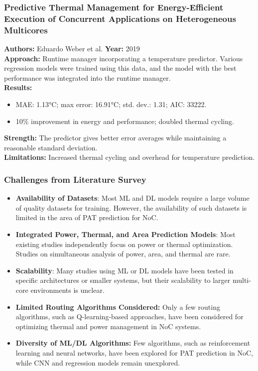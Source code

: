 \documentclass{beamer}
\begin{document}
\begin{frame}
\frametitle{Predictive Thermal Management for Energy-Efficient Execution of Concurrent Applications on Heterogeneous Multicores}

\textbf{Authors:} Eduardo Weber et al.
\textbf{Year:} 2019 \\[10pt]

\textbf{Approach:} Runtime manager incorporating a temperature predictor. Various regression models were trained using this data, and the model with the best performance was integrated into the runtime manager. \\[10pt]

\textbf{Results:}
\begin{itemize}
\item MAE: 1.13°C; max error: 16.91°C; std. dev.: 1.31; AIC: 33222.
\item 10\% improvement in energy and performance; doubled thermal cycling.
\end{itemize}

\textbf{Strength:} The predictor gives better error averages while maintaining a reasonable standard deviation. \\[10pt]

\textbf{Limitations:} Increased thermal cycling and overhead for temperature prediction. \\[10pt]

\end{frame}



\begin{frame}
\frametitle{Challenges from Literature Survey}

\begin{itemize}
    \item \textbf{Availability of Datasets}: Most ML and DL models require a large volume of quality datasets for training. However, the availability of such datasets is limited in the area of PAT prediction for NoC.
  
    \item \textbf{Integrated Power, Thermal, and Area Prediction Models}: Most existing studies independently focus on power or thermal optimization. Studies on simultaneous analysis of power, area, and thermal are rare.
  
    \item \textbf{Scalability}: Many studies using ML or DL models have been tested in specific architectures or smaller systems, but their scalability to larger multi-core environments is unclear.

    \item \textbf{Limited Routing Algorithms Considered:} Only a few routing algorithms, such as Q-learning-based approaches, have been considered for optimizing thermal and power management in NoC systems.

    \item \textbf{Diversity of ML/DL Algorithms:} Few algorithms, such as reinforcement learning and neural networks, have been explored for PAT prediction in NoC, while CNN and regression models remain unexplored.
\end{itemize}
\end{frame}
\end{document}
